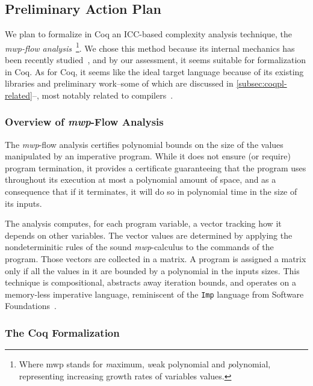 \subsection{Preliminary Action Plan}
\label{subsec:coqpl-preliminary-action-plan}

We plan to formalize in Coq an ICC-based complexity analysis technique, the \emph{mwp-flow analysis}~\cite{jones2009}\footnote{%
    Where mwp stands for \emph{m}aximum, \emph{w}eak polynomial and \emph{p}olynomial, representing increasing growth rates of variables values.}.
We chose this method because its internal mechanics has been recently studied~\cite{aubert20222}, and by our assessment, it seems suitable for formalization in Coq.
As for Coq, it seems like the ideal target language because of its existing libraries and preliminary work--some of which are discussed in \autoref{subsec:coqpl-related}--, most notably related to compilers~\cite{leroy2009}.

\subsubsection{Overview of \emph{mwp}-Flow Analysis}
\label{subsubsec:coqpl-overview-of-mwp-flow-analysis}

The \emph{mwp}-flow analysis certifies polynomial bounds on the size of the values manipulated by an imperative program.
While it does not ensure (or require) program termination, it provides a certificate guaranteeing that the program uses throughout its execution at most a polynomial amount of space, and as a consequence that if it terminates, it will do so in polynomial time in the size of its inputs.

The analysis computes, for each program variable, a vector tracking how it depends on other variables.
The vector values are determined by applying the nondeterminitic rules of the sound \emph{mwp}-calculus to the commands of the program.
Those vectors are collected in a matrix.
A program is assigned a matrix only if all the values in it are bounded by a polynomial in the inputs sizes.
This technique is compositional, abstracts away \eg iteration bounds, and operates on a memory-less imperative language, reminiscent of the \texttt{Imp} language from Software Foundations~\cite{cpierce20221}.

\subsubsection{The Coq Formalization}
\label{subsubsec:coqpl-the-coq-formalization}

